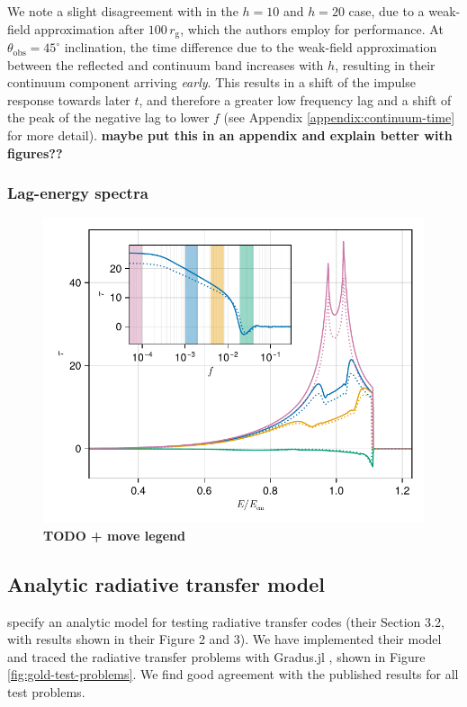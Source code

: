 \documentclass[fleqn,usenatbib]{mnras}
\newcommand{\todo}[1]{{\bf \color{red} #1}}
\newcommand{\Gradus}{Gradus.jl }
\newcommand{\rg}{r_\text{g}}
\begin{document}
We note a slight disagreement with \cite{cackett_modelling_2014} in the $h = 10$ and $h=20$ case, due to a weak-field approximation after $100\, \rg$, which the authors employ for performance. At $\theta_\text{obs} = 45^\circ$ inclination, the time difference due to the weak-field approximation between the reflected and continuum band increases with $h$, resulting in their continuum component arriving \textit{early}. This results in a shift of the impulse response towards later $t$, and therefore a greater low frequency lag and a shift of the peak of the negative lag to lower $f$ (see Appendix \ref{appendix:continuum-time} for more detail).
\todo{maybe put this in an appendix and explain better with figures??}

\subsubsection{Lag-energy spectra}

\begin{figure}
	\centering
	\includegraphics[width=0.98\linewidth]{figures/reverberation.lag-energy.pdf}
	\caption{\todo{TODO + move legend}}
	\label{fig:lag-energy}
\end{figure}


\subsection{Analytic radiative transfer model}

\cite{gold_verification_2020} specify an analytic model for testing radiative transfer codes (their Section 3.2, with results shown in their Figure 2 and 3). We have implemented their model and traced the radiative transfer problems with \Gradus, shown in Figure \ref{fig:gold-test-problems}. We find good agreement with the published results for all test problems.
\end{document}
